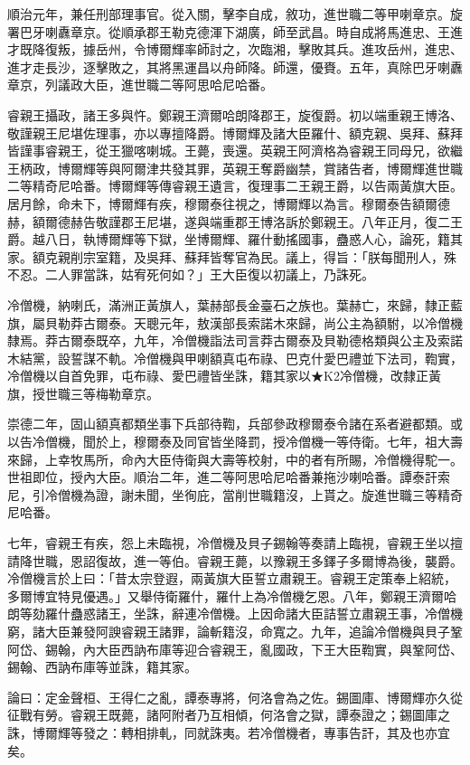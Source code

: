\begin{pinyinscope}
順治元年，兼任刑部理事官。從入關，擊李自成，敘功，進世職二等甲喇章京。旋署巴牙喇纛章京。從順承郡王勒克德渾下湖廣，師至武昌。時自成將馬進忠、王進才既降復叛，據岳州，令博爾輝率師討之，次臨湘，擊敗其兵。進攻岳州，進忠、進才走長沙，逐擊敗之，其將黑運昌以舟師降。師還，優賚。五年，真除巴牙喇纛章京，列議政大臣，進世職二等阿思哈尼哈番。

睿親王攝政，諸王多與忤。鄭親王濟爾哈朗降郡王，旋復爵。初以端重親王博洛、敬謹親王尼堪佐理事，亦以專擅降爵。博爾輝及諸大臣羅什、額克親、吳拜、蘇拜皆謹事睿親王，從王獵喀喇城。王薨，喪還。英親王阿濟格為睿親王同母兄，欲繼王柄政，博爾輝等與阿爾津共發其罪，英親王奪爵幽禁，賞諸告者，博爾輝進世職二等精奇尼哈番。博爾輝等傳睿親王遺言，復理事二王親王爵，以告兩黃旗大臣。居月餘，命未下，博爾輝有疾，穆爾泰往視之，博爾輝以為言。穆爾泰告額爾德赫，額爾德赫告敬謹郡王尼堪，遂與端重郡王博洛訴於鄭親王。八年正月，復二王爵。越八日，執博爾輝等下獄，坐博爾輝、羅什動搖國事，蠱惑人心，論死，籍其家。額克親削宗室籍，及吳拜、蘇拜皆奪官為民。議上，得旨：「朕每聞刑人，殊不忍。二人罪當誅，姑宥死何如？」王大臣復以初議上，乃誅死。

冷僧機，納喇氏，滿洲正黃旗人，葉赫部長金臺石之族也。葉赫亡，來歸，隸正藍旗，屬貝勒莽古爾泰。天聰元年，敖漢部長索諾木來歸，尚公主為額駙，以冷僧機隸焉。莽古爾泰既卒，九年，冷僧機詣法司言莽古爾泰及貝勒德格類與公主及索諾木結黨，設誓謀不軌。冷僧機與甲喇額真屯布祿、巴克什愛巴禮並下法司，鞫實，冷僧機以自首免罪，屯布祿、愛巴禮皆坐誅，籍其家以★K2冷僧機，改隸正黃旗，授世職三等梅勒章京。

崇德二年，固山額真都類坐事下兵部待鞫，兵部參政穆爾泰令諸在系者避都類。或以告冷僧機，聞於上，穆爾泰及同官皆坐降罰，授冷僧機一等侍衛。七年，祖大壽來歸，上幸牧馬所，命內大臣侍衛與大壽等校射，中的者有所賜，冷僧機得駝一。世祖即位，授內大臣。順治二年，進二等阿思哈尼哈番兼拖沙喇哈番。譚泰訐索尼，引冷僧機為證，謝未聞，坐徇庇，當削世職籍沒，上貰之。旋進世職三等精奇尼哈番。

七年，睿親王有疾，怨上未臨視，冷僧機及貝子錫翰等奏請上臨視，睿親王坐以擅請降世職，恩詔復故，進一等伯。睿親王薨，以豫親王多鐸子多爾博為後，襲爵。冷僧機言於上曰：「昔太宗登遐，兩黃旗大臣誓立肅親王。睿親王定策奉上紹統，多爾博宜特見優遇。」又舉侍衛羅什，羅什上為冷僧機乞恩。八年，鄭親王濟爾哈朗等劾羅什蠱惑諸王，坐誅，辭連冷僧機。上因命諸大臣詰誓立肅親王事，冷僧機窮，諸大臣兼發阿諛睿親王諸罪，論斬籍沒，命寬之。九年，追論冷僧機與貝子鞏阿岱、錫翰，內大臣西訥布庫等迎合睿親王，亂國政，下王大臣鞫實，與鞏阿岱、錫翰、西訥布庫等並誅，籍其家。

論曰：定金聲桓、王得仁之亂，譚泰專將，何洛會為之佐。錫圖庫、博爾輝亦久從征戰有勞。睿親王既薨，諸阿附者乃互相傾，何洛會之獄，譚泰證之；錫圖庫之誅，博爾輝等發之：轉相排軋，同就誅夷。若冷僧機者，專事告訐，其及也亦宜矣。


\end{pinyinscope}